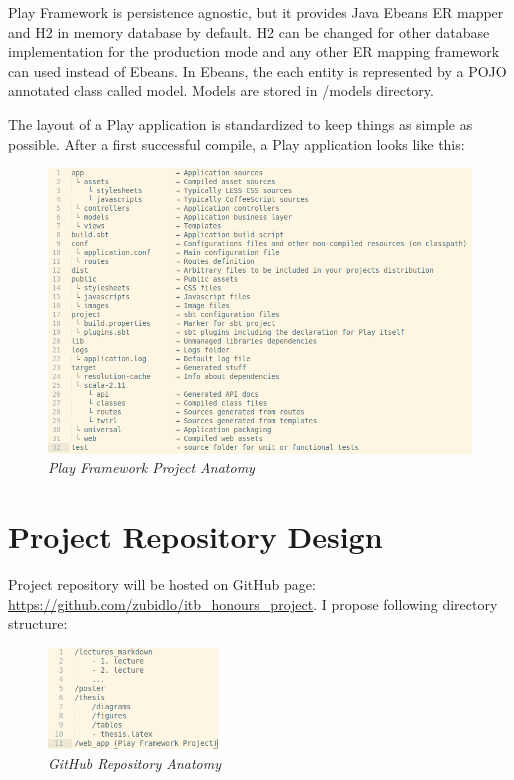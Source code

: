 \documentclass[12pt,twoside,a4paper]{report}
\begin{document}
Play Framework is persistence agnostic, but it provides Java Ebeans ER mapper and H2 in memory database by default. H2 can be changed for other database implementation for the production mode and any other ER mapping framework can used instead of Ebeans. In Ebeans, the each entity is represented by a POJO annotated class called model. Models are stored in /models directory.

The layout of a Play application is standardized to keep things as simple as possible. After a first successful compile, a Play application looks like this:

\begin{figure}[!ht]
	\centering
		\includegraphics[width=1\textwidth, totalheight=10cm]
		{play_framework_project_anatomy}
	\caption{\textit{Play Framework Project Anatomy}}
	\label{f3.9.1}
\end{figure}

\section{Project Repository Design}\label{3.10}
Project repository will be hosted on GitHub page: \url{https://github.com/zubidlo/itb_honours_project}.
I propose following directory structure:

\begin{figure}[!ht]
	\centering
		\includegraphics[width=0.4\textwidth, totalheight=4cm]
		{github_repo_anatomy}
	\caption{\textit{GitHub Repository Anatomy}}
	\label{f3.10}
\end{figure}
\end{document}
